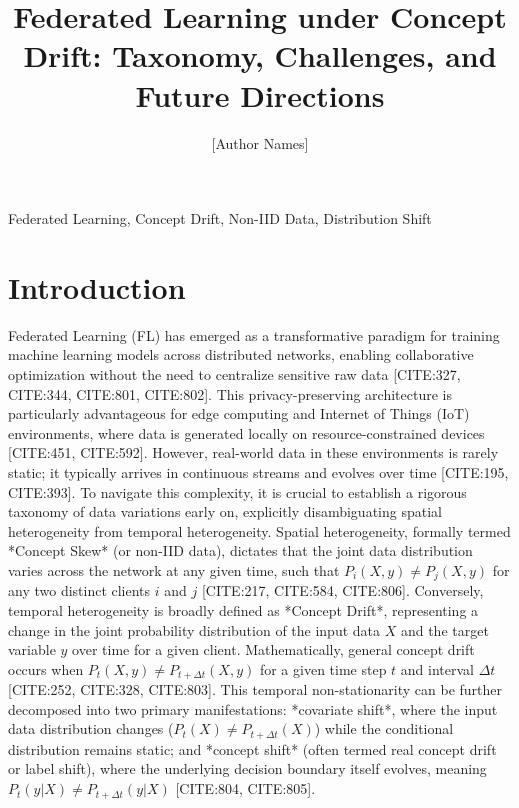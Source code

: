 \documentclass[journal]{IEEEtran}
\title{Federated Learning under Concept Drift: Taxonomy, Challenges, and Future Directions}
\author{[Author Names]}
\begin{document}
\maketitle

\begin{abstract}
\end{abstract}

\begin{IEEEkeywords}Federated Learning, Concept Drift, Non-IID Data, Distribution Shift\end{IEEEkeywords}

\section{Introduction}
\label{sec:introduction}

Federated Learning (FL) has emerged as a transformative paradigm for training machine learning models across distributed networks, enabling collaborative optimization without the need to centralize sensitive raw data [CITE:327, CITE:344, CITE:801, CITE:802]. This privacy-preserving architecture is particularly advantageous for edge computing and Internet of Things (IoT) environments, where data is generated locally on resource-constrained devices [CITE:451, CITE:592]. However, real-world data in these environments is rarely static; it typically arrives in continuous streams and evolves over time [CITE:195, CITE:393]. To navigate this complexity, it is crucial to establish a rigorous taxonomy of data variations early on, explicitly disambiguating spatial heterogeneity from temporal heterogeneity. Spatial heterogeneity, formally termed *Concept Skew* (or non-IID data), dictates that the joint data distribution varies across the network at any given time, such that $P_i(X, y) \neq P_j(X, y)$ for any two distinct clients $i$ and $j$ [CITE:217, CITE:584, CITE:806]. Conversely, temporal heterogeneity is broadly defined as *Concept Drift*, representing a change in the joint probability distribution of the input data $X$ and the target variable $y$ over time for a given client. Mathematically, general concept drift occurs when $P_t(X, y) \neq P_{t+\Delta t}(X, y)$ for a given time step $t$ and interval $\Delta t$ [CITE:252, CITE:328, CITE:803]. This temporal non-stationarity can be further decomposed into two primary manifestations: *covariate shift*, where the input data distribution changes ($P_t(X) \neq P_{t+\Delta t}(X)$) while the conditional distribution remains static; and *concept shift* (often termed real concept drift or label shift), where the underlying decision boundary itself evolves, meaning $P_t(y|X) \neq P_{t+\Delta t}(y|X)$ [CITE:804, CITE:805]. 
\end{document}

